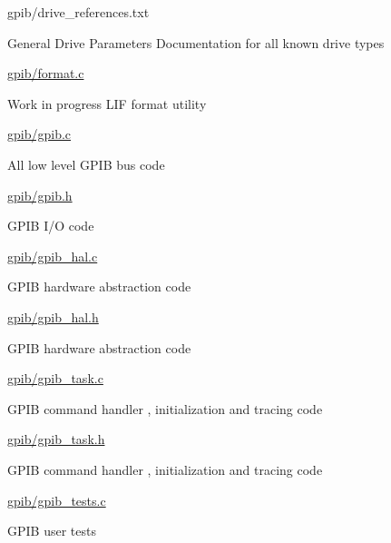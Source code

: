 \begin{DoxyItemize}
\begin{DoxyItemize}
\begin{DoxyItemize}
\end{DoxyItemize}
\item gpib/drive\+\_\+references.\+txt
\begin{DoxyItemize}
\item General Drive Parameters Documentation for all known drive types
\end{DoxyItemize}
\item \hyperlink{format_8c}{gpib/format.\+c}
\begin{DoxyItemize}
\item Work in progress L\+IF format utility
\end{DoxyItemize}
\item \hyperlink{gpib_8c}{gpib/gpib.\+c}
\begin{DoxyItemize}
\item All low level G\+P\+IB bus code
\end{DoxyItemize}
\item \hyperlink{gpib_8h}{gpib/gpib.\+h}
\begin{DoxyItemize}
\item G\+P\+IB I/O code
\end{DoxyItemize}
\item \hyperlink{gpib__hal_8c}{gpib/gpib\+\_\+hal.\+c}
\begin{DoxyItemize}
\item G\+P\+IB hardware abstraction code
\end{DoxyItemize}
\item \hyperlink{gpib__hal_8h}{gpib/gpib\+\_\+hal.\+h}
\begin{DoxyItemize}
\item G\+P\+IB hardware abstraction code
\end{DoxyItemize}
\item \hyperlink{gpib__task_8c}{gpib/gpib\+\_\+task.\+c}
\begin{DoxyItemize}
\item G\+P\+IB command handler , initialization and tracing code
\end{DoxyItemize}
\item \hyperlink{gpib__task_8h}{gpib/gpib\+\_\+task.\+h}
\begin{DoxyItemize}
\item G\+P\+IB command handler , initialization and tracing code
\end{DoxyItemize}
\item \hyperlink{gpib__tests_8c}{gpib/gpib\+\_\+tests.\+c}
\begin{DoxyItemize}
\item G\+P\+IB user tests

\end{DoxyItemize}
\end{DoxyItemize}
\end{DoxyItemize}
